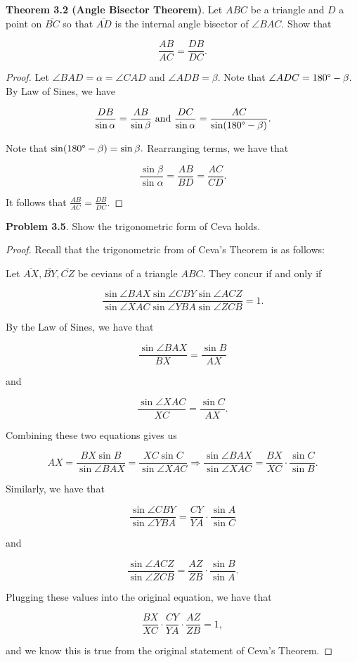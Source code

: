\documentclass[letterpaper,oneside]{book}
\begin{document}
\chapter{}
  \textbf{Theorem 3.2 (Angle Bisector Theorem)}.   Let $ABC$ be a triangle and $D$ a point on $\overline{BC}$ so that $\overline{AD}$ is the internal angle bisector of $\angle BAC.$ Show that

$$\frac{AB}{AC} = \frac{DB}{DC}.$$

 \begin{proof}  Let $\angle BAD = \alpha = \angle CAD$ and $\angle ADB = \beta.$ Note that $\angle ADC = 180\degree - \beta.$ By Law of Sines, we have

$$\frac{DB}{\sin\alpha} = \frac{AB}{\sin\beta} \text{  and  } \frac{DC}{\sin\alpha} = \frac{AC}{\sin(180\degree - \beta)}.$$

Note that $\sin(180\degree-\beta) = \sin\beta.$ Rearranging terms, we have that

$$\frac{\sin\beta}{\sin\alpha} = \frac{AB}{BD} = \frac{AC}{CD}.$$

It follows that $\frac{AB}{AC} = \frac{DB}{DC}.$
 \end{proof}



  \textbf{Problem 3.5}.   Show the trigonometric form of Ceva holds.

 \begin{proof}  Recall that the trigonometric from of Ceva's Theorem is as follows:

Let $\overline{AX}, \overline{BY}, \overline{CZ}$ be cevians of a triangle $ABC.$ They concur if and only if 

$$\frac{\sin \angle BAX \sin \angle CBY \sin \angle ACZ}{\sin \angle XAC \sin \angle YBA \sin \angle ZCB} = 1.$$

By the Law of Sines, we have that

$$\frac{\sin\angle BAX}{BX} = \frac{\sin B}{AX}$$

and

$$\frac{\sin\angle XAC}{XC} = \frac{\sin C}{AX}.$$

Combining these two equations gives us

$$AX = \frac{BX \sin B}{\sin\angle BAX}=\frac{XC \sin C}{\sin\angle XAC} \Rightarrow \frac{\sin \angle BAX}{\sin \angle XAC} = \frac{BX}{XC} \cdot \frac{\sin C}{\sin B}.$$

Similarly, we have that 

$$\frac{\sin \angle CBY}{\sin \angle YBA} = \frac{CY}{YA}\cdot \frac{\sin A}{\sin C} $$

and

$$
\frac{\sin \angle ACZ}{\sin \angle ZCB} = \frac{AZ}{ZB}\cdot \frac{\sin B}{\sin A}. $$

Plugging these values into the original equation, we have that

$$\frac{BX}{XC}\cdot \frac{CY}{YA} \cdot \frac{AZ}{ZB} = 1,$$

and we know this is true from the original statement of Ceva's Theorem.
\end{proof}
\end{document}
